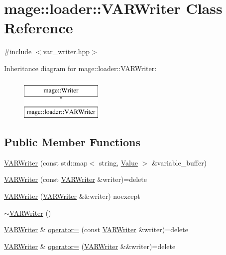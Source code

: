 \hypertarget{classmage_1_1loader_1_1_v_a_r_writer}{}\section{mage\+:\+:loader\+:\+:V\+A\+R\+Writer Class Reference}
\label{classmage_1_1loader_1_1_v_a_r_writer}


{\ttfamily \#include $<$var\+\_\+writer.\+hpp$>$}

Inheritance diagram for mage\+:\+:loader\+:\+:V\+A\+R\+Writer\+:\begin{figure}[H]
\begin{center}
\leavevmode
\includegraphics[height=2.000000cm]{classmage_1_1loader_1_1_v_a_r_writer}
\end{center}
\end{figure}
\subsection*{Public Member Functions}
\begin{DoxyCompactItemize}
\item 
\hyperlink{classmage_1_1loader_1_1_v_a_r_writer_af9b9e552dc77446790bbd52390b42582}{V\+A\+R\+Writer} (const std\+::map$<$ string, \hyperlink{namespacemage_aa1fe0628487e0706e44efdc62dbdb3a2}{Value} $>$ \&variable\+\_\+buffer)
\item 
\hyperlink{classmage_1_1loader_1_1_v_a_r_writer_a5ddb3fcd75952ecc8593bc284dc3db0e}{V\+A\+R\+Writer} (const \hyperlink{classmage_1_1loader_1_1_v_a_r_writer}{V\+A\+R\+Writer} \&writer)=delete
\item 
\hyperlink{classmage_1_1loader_1_1_v_a_r_writer_ab8a676252c909a6f8914d786048de255}{V\+A\+R\+Writer} (\hyperlink{classmage_1_1loader_1_1_v_a_r_writer}{V\+A\+R\+Writer} \&\&writer) noexcept
\item 
\hyperlink{classmage_1_1loader_1_1_v_a_r_writer_af908fe01c6754dabec6ed3c45b852b3b}{$\sim$\+V\+A\+R\+Writer} ()
\item 
\hyperlink{classmage_1_1loader_1_1_v_a_r_writer}{V\+A\+R\+Writer} \& \hyperlink{classmage_1_1loader_1_1_v_a_r_writer_a6ffe21455dfc82f8d829d9cabe59ba53}{operator=} (const \hyperlink{classmage_1_1loader_1_1_v_a_r_writer}{V\+A\+R\+Writer} \&writer)=delete
\item 
\hyperlink{classmage_1_1loader_1_1_v_a_r_writer}{V\+A\+R\+Writer} \& \hyperlink{classmage_1_1loader_1_1_v_a_r_writer_aef0efc3b6d9ca8c0da5e45063da01365}{operator=} (\hyperlink{classmage_1_1loader_1_1_v_a_r_writer}{V\+A\+R\+Writer} \&\&writer)=delete
\end{DoxyCompactItemize}

